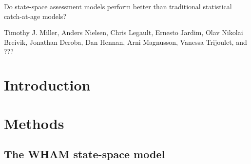 \documentclass[12pt,letterpaper, leqno]{article}
\begin{document}


\pagestyle{plain}

\begin{titlepage}\center \large

\vspace{144pt}

Do state-space assessment models perform better than traditional statistical catch-at-age models?

\vspace{144pt}

Timothy J. Miller, Anders Nielsen, Chris Legault, Ernesto Jardim, Olav Nikolai Breivik, Jonathan Deroba, Dan Hennan, Arni Magnusson, Vanessa Trijoulet, %
and ???
\end{titlepage}

\setcounter{page}{2}

\cfoot{\thepage}

\setcounter{page}{2}
\def\fourteenbold{\fontseries{b}\fontsize{14pt}{12pt}\selectfont}
\def\twelvebold{\fontseries{b}\fontsize{12pt}{12pt}\selectfont}
\def\twelveit{\fontshape{it}\fontseries{m}\fontsize{12pt}{12pt}\selectfont}
\sectionfont{\fourteenbold}
\subsectionfont{\twelvebold}
\subsectionfont{\twelvebold}
\subsubsectionfont{\twelveit}

\setcounter{footnote}{0}




\pagebreak

\section*{Introduction}

\section*{Methods}

\subsection*{The WHAM state-space model}
\end{document}
